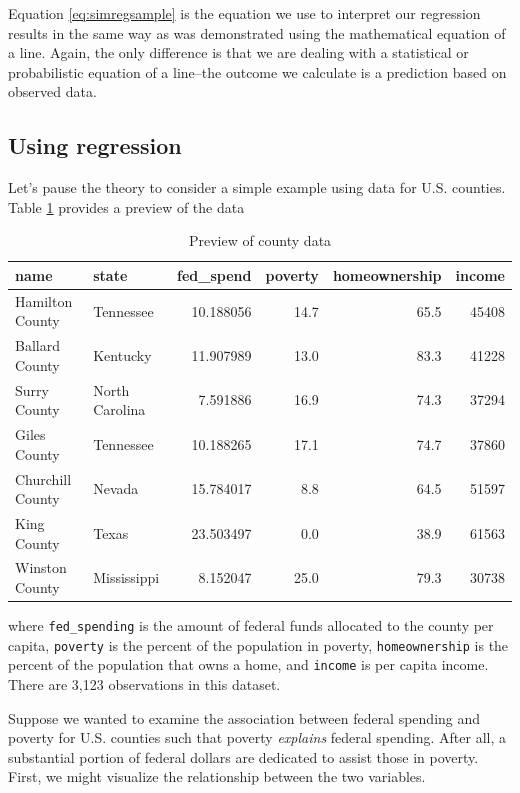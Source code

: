 \documentclass[
]{book}
\begin{document}
Equation \eqref{eq:simregsample} is the equation we use to interpret our regression results in the same way as was demonstrated using the mathematical equation of a line. Again, the only difference is that we are dealing with a statistical or probabilistic equation of a line--the outcome we calculate is a prediction based on observed data.

\hypertarget{using-regression}{%
\subsection{Using regression}\label{using-regression}}

Let's pause the theory to consider a simple example using data for U.S. counties. Table \ref{tab:countydata} provides a preview of the data

\begin{table}

\caption{\label{tab:countydata}Preview of county data}
\centering
\begin{tabular}[t]{l|l|r|r|r|r}
\hline
name & state & fed\_spend & poverty & homeownership & income\\
\hline
Hamilton County & Tennessee & 10.188056 & 14.7 & 65.5 & 45408\\
\hline
Ballard County & Kentucky & 11.907989 & 13.0 & 83.3 & 41228\\
\hline
Surry County & North Carolina & 7.591886 & 16.9 & 74.3 & 37294\\
\hline
Giles County & Tennessee & 10.188265 & 17.1 & 74.7 & 37860\\
\hline
Churchill County & Nevada & 15.784017 & 8.8 & 64.5 & 51597\\
\hline
King County & Texas & 23.503497 & 0.0 & 38.9 & 61563\\
\hline
Winston County & Mississippi & 8.152047 & 25.0 & 79.3 & 30738\\
\hline
\end{tabular}
\end{table}

where \texttt{fed\_spending} is the amount of federal funds allocated to the county per capita, \texttt{poverty} is the percent of the population in poverty, \texttt{homeownership} is the percent of the population that owns a home, and \texttt{income} is per capita income. There are 3,123 observations in this dataset.

Suppose we wanted to examine the association between federal spending and poverty for U.S. counties such that poverty \emph{explains} federal spending. After all, a substantial portion of federal dollars are dedicated to assist those in poverty. First, we might visualize the relationship between the two variables.
\end{document}
